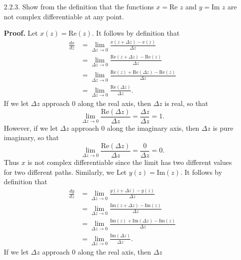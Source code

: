 \documentclass[9pt]{article}
\begin{document}
\begin{enumerate}
   \item[2.2.3.]  Show from the definition that the functions $x = \text{Re }z$
                  and $y = \text{Im }z$ are not complex differentiable at any 
                  point.
                  
      \textbf{Proof.} Let $x(z) = \text{Re}(z)$. It follows by definition that
      \begin{align*}
         \frac{dx}{dz} &= \lim_{\Delta z\rightarrow 0}
            \frac{x(z + \Delta z) - x(z)}{\Delta z} \\
            &=  \lim_{\Delta z\rightarrow 0}
            \frac{\text{Re}(z + \Delta z) - \text{Re}(z)}{\Delta z} \\
            &=  \lim_{\Delta z\rightarrow 0}
            \frac{\text{Re}(z) + \text{Re}(\Delta z) - \text{Re}(z)}{\Delta z} \\
            &=  \lim_{\Delta z\rightarrow 0}
            \frac{\text{Re}(\Delta z)}{\Delta z}.
      \end{align*}      
      If we let $\Delta z$ approach 0 along the real axis, then $\Delta z$
      is real, so that 
      $$\lim_{\Delta z\rightarrow 0}\frac{\text{Re}(\Delta z)}{\Delta z}
        = \frac{\Delta z}{\Delta z} = 1.$$     
      However, if we let $\Delta z$ approach 0 along the imaginary axis, then
      $\Delta z$ is pure imaginary, so that 
      $$\lim_{\Delta z\rightarrow 0}\frac{\text{Re}(\Delta z)}{\Delta z}
        = \frac{0}{\Delta z} = 0.$$
      Thus $x$ is not complex differentiable since the limit has two different
      values for two different paths. Similarly, we Let $y(z) = \text{Im}(z)$.
      It follows by definition that
      \begin{align*}
         \frac{dy}{dz} &= \lim_{\Delta z\rightarrow 0}
            \frac{y(z + \Delta z) - y(z)}{\Delta z} \\
            &=  \lim_{\Delta z\rightarrow 0}
            \frac{\text{Im}(z + \Delta z) - \text{Im}(z)}{\Delta z} \\
            &=  \lim_{\Delta z\rightarrow 0}
            \frac{\text{Im}(z) + \text{Im}(\Delta z) - \text{Im}(z)}{\Delta z} \\
            &=  \lim_{\Delta z\rightarrow 0}
            \frac{\text{Im}(\Delta z)}{\Delta z}.
      \end{align*}      
      If we let $\Delta z$ approach 0 along the real axis, then $\Delta z$

\end{enumerate}
\end{document}

